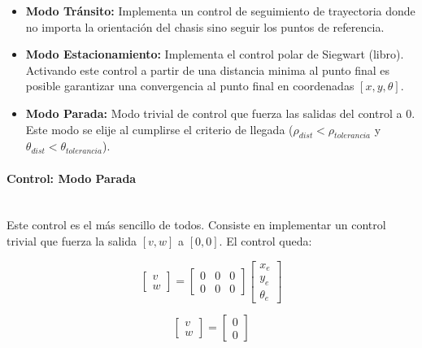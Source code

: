 \begin{itemize}
	\item \textbf{Modo Tránsito:} Implementa un control de seguimiento de trayectoria donde no importa la orientación del chasis sino seguir los puntos de referencia.
	\item \textbf{Modo Estacionamiento:} Implementa el control polar de Siegwart (libro). Activando este control a partir de una distancia minima al punto final es posible garantizar una convergencia al punto final en coordenadas $[x,y,\theta]$.
	\item \textbf{Modo Parada:} Modo trivial de control que fuerza las salidas del control a 0. Este modo se elije al cumplirse el criterio de llegada ($\rho_{dist}<\rho_{tolerancia}$ y $\theta_{dist}<\theta_{tolerancia}$).
\end{itemize}

\paragraph{Control: Modo Parada}~\\
Este control es el más sencillo de todos. Consiste en implementar un control trivial que fuerza la salida $[v,w]$ a $[0,0]$. El control queda:

\begin{equation*}	
	\begin{bmatrix}
		v \\
		w 
	\end{bmatrix}
	=
	\begin{bmatrix}
		0 & 0 & 0 \\
		0 & 0 & 0  
	\end{bmatrix}
	\begin{bmatrix}
		x_e \\
		y_e \\
		\theta_e
	\end{bmatrix}
\end{equation*}

\begin{equation*}	
	\begin{bmatrix}
		v \\
		w 
	\end{bmatrix}
	=
	\begin{bmatrix}
		0 \\
		0
	\end{bmatrix}
\end{equation*}



